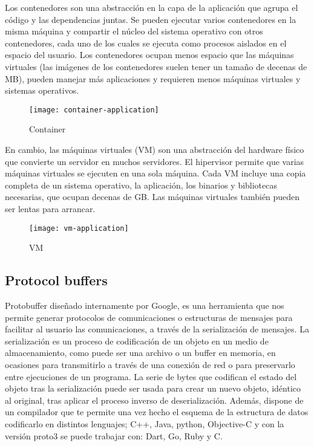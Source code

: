 \documentclass[ spanish, a4paper, 12pt, oneside]{report}
\begin{document}
Los contenedores son una abstracción en la capa de la aplicación que agrupa el código y las dependencias juntas. 
Se pueden ejecutar varios contenedores en la misma máquina y compartir el núcleo del sistema operativo con otros 
contenedores, cada uno de los cuales se ejecuta como procesos aislados en el espacio del usuario. Los contenedores ocupan 
menos espacio que las máquinas virtuales (las imágenes de los contenedores suelen tener un tamaño de decenas de MB), 
pueden manejar más aplicaciones y requieren menos máquinas virtuales y sistemas operativos.\\

\begin{figure}[!h]
   \centering
   \texttt{[image: container-application]}\\
      \caption{\label{fig: container} Container}
\end{figure}


En cambio, las máquinas virtuales (VM) son una abstracción del hardware físico que convierte un servidor en muchos 
servidores. El hipervisor permite que varias máquinas virtuales se ejecuten en una sola máquina. Cada VM incluye una 
copia completa de un sistema operativo, la aplicación, los binarios y bibliotecas necesarias, que ocupan decenas de GB. 
Las máquinas virtuales también pueden ser lentas para arrancar.\\

\begin{figure}[!h]
   \centering
   \texttt{[image: vm-application]}\\
      \caption{\label{fig: vm} VM}
\end{figure}



\subsection{Protocol buffers}
Protobuffer diseñado internamente por Google, es una herramienta que nos permite generar protocolos de comunicaciones o estructuras de mensajes para facilitar al usuario las comunicaciones, a través de la serialización de mensajes.
La serialización es un proceso de codificación de un objeto en un medio de almacenamiento, como puede ser una archivo o un buffer en memoria, en ocasiones para transmitirlo a través de una conexión de red o para preservarlo entre ejecuciones 
de un programa. La serie de bytes que codifican el estado del objeto tras la serialización puede ser usada para crear un nuevo objeto, idéntico al original, tras aplicar el proceso inverso de deserialización. Además, dispone de un compilador que 
te permite una vez hecho el esquema de la estructura de datos codificarlo en distintos lenguajes; C++, Java, python, Objective-C y con la versión proto3 se puede trabajar con: Dart, Go, Ruby y C. \\ 
\end{document}
